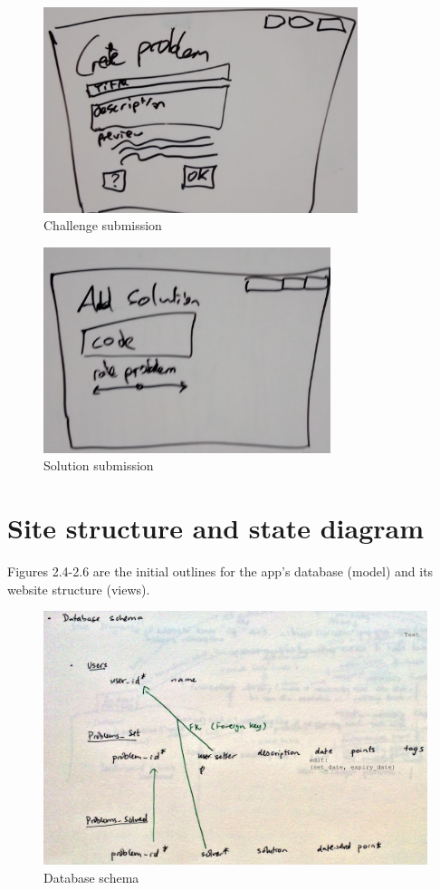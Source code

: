 \documentclass{report}
\begin{document}
\begin{figure}[H]
\centerline{\includegraphics[height=6cm]{newProblemMockup}}
\caption{Challenge submission}
\end{figure}

\begin{figure}[H]
\centerline{\includegraphics[height=6cm]{newSolutionMockup}}
\caption{Solution submission}
\end{figure}

\section{Site structure and state diagram}
Figures 2.4-2.6 are the initial outlines for the app’s database (model) and its website structure (views).

\begin{figure}[H]
\includegraphics[width=\textwidth]{schema}
\caption{Database schema}
\end{figure}
\end{document}

